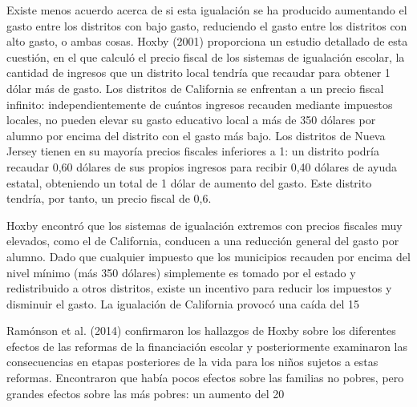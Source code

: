 \documentclass[10pt,a4paper]{article}
\begin{document}
Existe menos acuerdo acerca de si esta igualación se ha producido aumentando el gasto entre los distritos con bajo gasto, reduciendo el gasto entre los distritos con alto gasto, o ambas cosas. Hoxby (2001) proporciona un estudio detallado de esta cuestión, en el que calculó el precio fiscal de los sistemas de igualación escolar, la cantidad de ingresos que un distrito local tendría que recaudar para obtener 1 dólar más de gasto. Los distritos de California se enfrentan a un precio fiscal infinito: independientemente de cuántos ingresos recauden mediante impuestos locales, no pueden elevar su gasto educativo local a más de 350 dólares por alumno por encima del distrito con el gasto más bajo. Los distritos de Nueva Jersey tienen en su mayoría precios fiscales inferiores a 1: un distrito podría recaudar 0,60 dólares de sus propios ingresos para recibir 0,40 dólares de ayuda estatal, obteniendo un total de 1 dólar de aumento del gasto. Este distrito tendría, por tanto, un precio fiscal de 0,6.

Hoxby encontró que los sistemas de igualación extremos con precios fiscales muy elevados, como el de California, conducen a una reducción general del gasto por alumno. Dado que cualquier impuesto que los municipios recauden por encima del nivel mínimo (más 350 dólares) simplemente es tomado por el estado y redistribuido a otros distritos, existe un incentivo para reducir los impuestos y disminuir el gasto. La igualación de California provocó una caída del 15 %

Ramónson et al. (2014) confirmaron los hallazgos de Hoxby sobre los diferentes efectos de las reformas de la financiación escolar y posteriormente examinaron las consecuencias en etapas posteriores de la vida para los niños sujetos a estas reformas. Encontraron que había pocos efectos sobre las familias no pobres, pero grandes efectos sobre las más pobres: un aumento del 20 %
\end{document}
